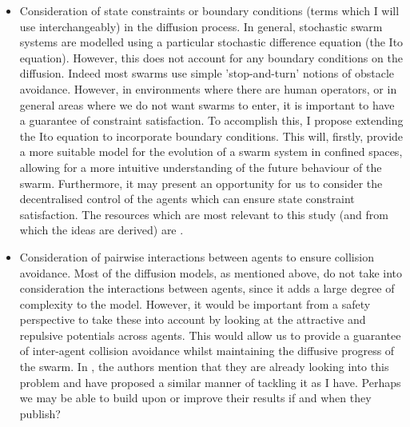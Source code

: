 \documentclass[preprint,11pt]{report}
\begin{document}
\begin{itemize}
	\item Consideration of state constraints or boundary conditions (terms which I will use
interchangeably) in the diffusion process. In general, stochastic swarm systems are modelled using a
particular stochastic difference equation (the Ito equation). However, this does not account for any
boundary conditions on the diffusion. Indeed most swarms use simple 'stop-and-turn' notions of
obstacle avoidance. However, in environments where there are human operators, or in general areas
where we do not want swarms to enter, it is important to have a guarantee of constraint
satisfaction. To accomplish this, I propose extending the Ito equation to incorporate boundary
conditions. This will, firstly, provide a more suitable model for the evolution of a swarm system in
confined spaces, allowing for a more intuitive understanding of the future behaviour of the swarm.
Furthermore, it may present an opportunity for us to consider the decentralised control of the
agents which can ensure state constraint satisfaction. The resources which are most relevant to this
study (and from which the ideas are derived) are
\cite{Inoue2019,Sartoretti2014,Shahrokhi2019,Li2017}. 

\item Consideration of pairwise interactions between agents to ensure collision avoidance. Most of
the diffusion models, as mentioned above, do not take into consideration the interactions between
agents, since it adds a large degree of complexity to the model. However, it would be important from
a safety perspective to take these into account by looking at the attractive and repulsive
potentials across agents. This would allow us to provide a guarantee of inter-agent collision
avoidance whilst maintaining the diffusive progress of the swarm. In \cite{Inoue2019}, the authors
mention that they are already looking into this problem and have proposed a similar manner of
tackling it as I have. Perhaps we may be able to build upon or improve their results if and when
they publish?


\end{itemize}
\end{document}
